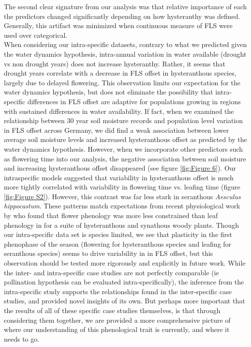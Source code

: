 \documentclass[12pt]{article}\usepackage[]{graphicx}\usepackage[]{color}
\begin{document}
\indent The second clear signature from our analysis was that relative importance of each the predictors changed significantly depending on how hysteranthy was defined. Generally, this artifact was minimized when continuous measure of FLS were used over categorical.\\
\indent When considering our intra-specific datasets, contrary to what we predicted given the water dynamics hypothesis, intra-annual variation in water available (drought vs non drought years) does not increase hysteranthy. Rather, it seems that drought years correlate with a decrease in FLS offset in hysteranthous species, largely due to delayed flowering. This observation limits our expectation for the water dynamics hypothesis, but does not eliminate the possibility that intra-specific differences in FLS offset are adaptive for populations growing in regions with sustained differences in water availability. If fact, when we examined the relationship between 30 year soil moisture records and population level variation in FLS offset across Germany, we did find a weak association between lower average soil moisture levels and increased hysteranthous offset as predicted by the water dynamics hypothesis. However, when we incorporate other predictors such as flowering time into our analysis, the negative association between soil moisture and increasing hysteranthous offset disappeared (see figure \ref{fig:Figure 6}). Our intraspecific models suggested that variability in hysteranthous offset is much more tightly correlated with variability in flowering time vs. leafing time (figure \ref{fig:Figure S2}). However, this contrast was far less stark in seranthous \textit{Aesculus hippocastum}. These patterns match expectations from recent physiological work by \citet{Savage2019} who found that flower phenology was more less constrained than leaf phenology in for a suite of hysteranthous and synathous woody plants. Though our intra-specific data set is species limited, we see that plasticity in the first phenophase of the season (flowering for hysteranthous species and leafing for seranthous species) seems to drive variability in in FLS offset, but this observation should be tested more rigorously and explicitly in future work. While the inter- and intra-specific case studies are not perfectly comparable (ie pollination hypothesis can be evaluated intra-specifically), the inference from the intra-specific study supports the relationships found in the inter-specific case studies, and provided novel insights of its own. But perhaps more important that the results of all of these specific case studies themselves, is that through considering them together, we are provided a more comprehensive picture of where our understanding of this phenological trait is currently, and where it needs to go. 
\end{document}
